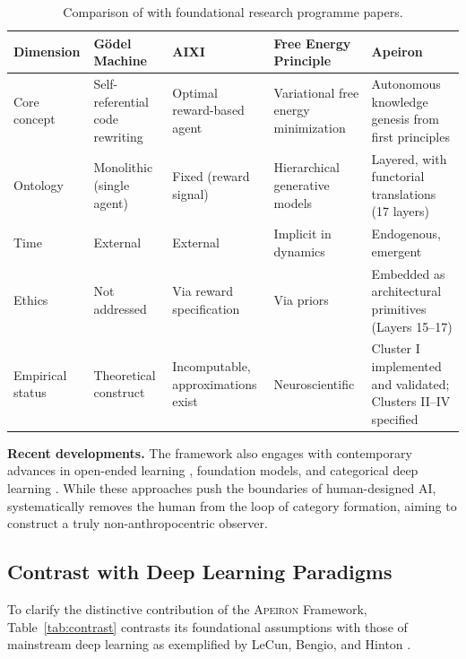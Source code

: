 \begin{table}[htbp]
\centering
\caption{Comparison of \Apeiron{} with foundational research programme papers.}
\label{tab:comparison_precedents}
\begin{tabular}{p{1.6cm} p{2.2cm} p{2.2cm} p{2.2cm} p{2.2cm}}
\toprule
\textbf{Dimension} & \textbf{G\"odel Machine} & \textbf{AIXI} & \textbf{Free Energy Principle} & \textbf{Apeiron} \\
\midrule
Core concept & Self-referential code rewriting & Optimal reward-based agent & Variational free energy minimization & Autonomous knowledge genesis from first principles \\
Ontology & Monolithic (single agent) & Fixed (reward signal) & Hierarchical generative models & Layered, with functorial translations (17 layers) \\
Time & External & External & Implicit in dynamics & Endogenous, emergent \\
Ethics & Not addressed & Via reward specification & Via priors & Embedded as architectural primitives (Layers 15--17) \\
Empirical status & Theoretical construct & Incomputable, approximations exist & Neuroscientific & Cluster I implemented and validated; Clusters II--IV specified \\
\bottomrule
\end{tabular}
\end{table}

\noindent\textbf{Recent developments.} The framework also engages with contemporary advances in open-ended learning \cite{stanley2019}, foundation models, and categorical deep learning \cite{gavranovic2024}. While these approaches push the boundaries of human-designed AI, \Apeiron{} systematically removes the human from the loop of category formation, aiming to construct a truly non-anthropocentric observer.

\subsection{Contrast with Deep Learning Paradigms}
\label{subsec:contrast}

To clarify the distinctive contribution of the \textsc{Apeiron} Framework, Table~\ref{tab:contrast} contrasts its foundational assumptions with those of mainstream deep learning as exemplified by LeCun, Bengio, and Hinton \cite{lecun2015}.

